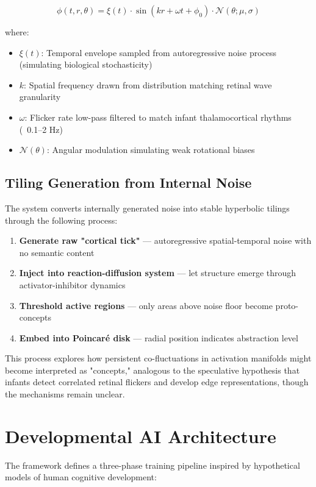 \documentclass[10pt]{article}
\begin{document}
$$\phi(t,r,\theta) = \xi(t) \cdot \sin(kr + \omega t + \phi_0) \cdot \mathcal{N}(\theta; \mu, \sigma)$$

where:
\begin{itemize}
    \item $\xi(t)$: Temporal envelope sampled from autoregressive noise process (simulating biological stochasticity)
    \item $k$: Spatial frequency drawn from distribution matching retinal wave granularity
    \item $\omega$: Flicker rate low-pass filtered to match infant thalamocortical rhythms (~0.1–2 Hz)
    \item $\mathcal{N}(\theta)$: Angular modulation simulating weak rotational biases
\end{itemize}

\subsection{Tiling Generation from Internal Noise}

The system converts internally generated noise into stable hyperbolic tilings through the following process:

\begin{enumerate}
    \item \textbf{Generate raw "cortical tick"} — autoregressive spatial-temporal noise with no semantic content
    \item \textbf{Inject into reaction-diffusion system} — let structure emerge through activator-inhibitor dynamics
    \item \textbf{Threshold active regions} — only areas above noise floor become proto-concepts  
    \item \textbf{Embed into Poincaré disk} — radial position indicates abstraction level
\end{enumerate}

This process explores how persistent co-fluctuations in activation manifolds might become interpreted as "concepts," analogous to the speculative hypothesis that infants detect correlated retinal flickers and develop edge representations, though the mechanisms remain unclear.

\section{Developmental AI Architecture}

The framework defines a three-phase training pipeline inspired by hypothetical models of human cognitive development:
\end{document}
